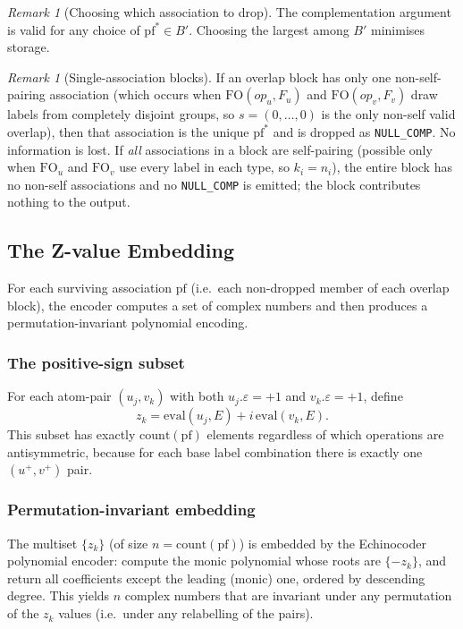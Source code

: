 \documentclass[11pt,a4paper]{article}
\theoremstyle{definition}
\theoremstyle{plain}
\theoremstyle{remark}
\newtheorem{remark}[definition]{Remark}
\newcommand{\eval}{\mathrm{eval}}
\newcommand{\fo}{\mathrm{FO}}
\newcommand{\pf}{\mathrm{pf}}
\newcommand{\acount}{\mathrm{count}}
\begin{document}
\begin{remark}[Choosing which association to drop]
The complementation argument is valid for any choice of $\pf^* \in B'$.
Choosing the largest among $B'$ minimises storage.
\end{remark}

\begin{remark}[Single-association blocks]
If an overlap block has only one non-self-pairing association (which occurs when
$\fo(\mathit{op}_u, F_u)$ and $\fo(\mathit{op}_v, F_v)$ draw labels from
completely disjoint groups, so $s = (0,\ldots,0)$ is the only non-self valid
overlap), then that association is the unique $\pf^*$ and is dropped as
\texttt{NULL\_COMP}.  No information is lost.  If \emph{all} associations in a
block are self-pairing (possible only when $\fo_u$ and $\fo_v$ use every label
in each type, so $k_i = n_i$), the entire block has no non-self associations
and no \texttt{NULL\_COMP} is emitted; the block contributes nothing to the
output.
\end{remark}

\subsection{The Z-value Embedding}
\label{sec:z-embed}

For each surviving association $\pf$ (i.e.\ each non-dropped member of each
overlap block), the encoder computes a set of complex numbers and then produces
a permutation-invariant polynomial encoding.

\subsubsection{The positive-sign subset}

For each atom-pair $(u_j, v_k)$ with both $u_j.\varepsilon = +1$ and
$v_k.\varepsilon = +1$, define
\[
  z_k = \eval(u_j, E) + i\,\eval(v_k, E).
\]
This subset has exactly $\acount(\pf)$ elements regardless of which operations
are antisymmetric, because for each base label combination there is exactly one
$(u^+, v^+)$ pair.

\subsubsection{Permutation-invariant embedding}

The multiset $\{z_k\}$ (of size $n = \acount(\pf)$) is embedded by the
Echinocoder polynomial encoder: compute the monic polynomial whose roots are
$\{-z_k\}$, and return all coefficients except the leading (monic) one,
ordered by descending degree.  This yields $n$ complex numbers that are
invariant under any permutation of the $z_k$ values (i.e.\ under any relabelling
of the pairs).
\end{document}

